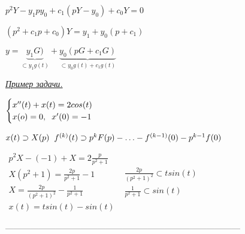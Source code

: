 \vspace{0.5cm}
\begin{Large}
$
p^2Y-y_1py_0 + c_1(pY - y_0) + c_0Y = 0
$

$
(p^2 + c_1p + c_0)Y = y_1 + y_0(p+c_1)
$

$
y = \underbrace{y_1G)}_{\subset y_1g(t)} 
+
\underbrace{y_0(pG + c_1G)}_{\subset y_0g(t) + c_1g(t)}
$
\end{Large}


\newpage
\begin{LARGE}
\textit{\underline{Пример задачи.}}
\end{LARGE}

\vspace{0.5cm}
$
\begin{cases}
	x^{\prime\prime}(t) + x(t) = 2cos(t) 
	\\
	x(o) = 0, 	\text{\hspace{0.2cm}} x^{\prime}(0) = -1
\end{cases}
$

\vspace{0.5cm}
$
x(t) \supset X(p) \text{\hspace{0.2cm}} f^{(k)}(t) \supset p^kF(p) - \ldots
-
f^{(k-1)}(0)- p^{k-1}f(0)
$

\vspace{0.5cm}
\begin{Large}
$
\begin{matrix}
p^2X - (-1)  + X = 2\frac{p}{p^2 + 1} \\
X(p^2+1) = \frac{2p}{p^2+1} - 1 \\
X = \frac{2p}{(p^2 + 1)^2} - \frac{1}{p^2 + 1} \\
x(t) = tsin(t) - sin(t)
\end{matrix}
$
\hspace{2cm}
$
\begin{matrix}
	 \frac{2p}{(p^2 + 1)^2}\subset tsin(t) \\
	 \frac{1}{p^2 + 1} \subset sin(t)
\end{matrix}
$

\end{Large}
------------------------------------------------------------------------------------

